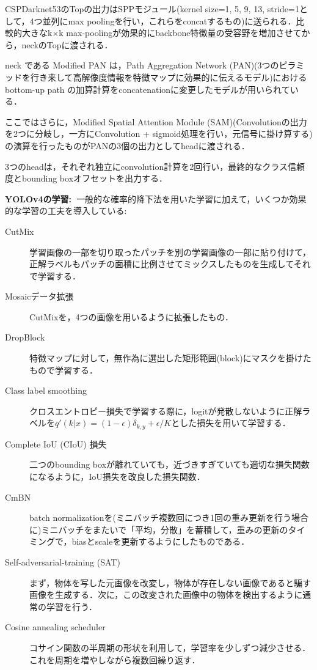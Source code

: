 \documentclass[originalpaper]{jsaiart}     %
\begin{document}
CSPDarknet53のTopの出力はSPPモジュール(kernel size={1, 5, 9, 13}, stride=1として，4つ並列にmax poolingを行い，これらをconcatするもの)に送られる．比較的大きなk$\times$k max-poolingが効果的にbackbone特徴量の受容野を増加させてから，neckのTopに渡される．

neck である Modified PAN は，Path Aggregation Network (PAN)(3つのピラミッドを行き来して高解像度情報を特徴マップに効果的に伝えるモデル)におけるbottom-up path の加算計算をconcatenationに変更したモデルが用いられている．

ここではさらに，Modified Spatial Attention Module (SAM)(Convolutionの出力を2つに分岐し，一方にConvolution + sigmoid処理を行い，元信号に掛け算する)の演算を行ったものがPANの3個の出力としてheadに渡される．

3つのheadは，それぞれ独立にconvolution計算を2回行い，最終的なクラス信頼度とbounding boxオフセットを出力する．

{\bf YOLOv4の学習:\ }一般的な確率的降下法を用いた学習に加えて，いくつか効果的な学習の工夫を導入している: 

\begin{description}
    \item[CutMix] 学習画像の一部を切り取ったパッチを別の学習画像の一部に貼り付けて，正解ラベルもパッチの面積に比例させてミックスしたものを生成してそれで学習する．
    \item[Mosaicデータ拡張] CutMixを，4つの画像を用いるように拡張したもの．
    \item[DropBlock] 特徴マップに対して，無作為に選出した矩形範囲(block)にマスクを掛けたもので学習する．
    \item[Class label smoothing] クロスエントロピー損失で学習する際に，logitが発散しないように正解ラベルを$q'(k|x)=(1-\epsilon)\delta_{k,y}+\epsilon/K$とした損失を用いて学習する．
    \item[Complete IoU (CIoU) 損失] 二つのbounding boxが離れていても，近づきすぎていても適切な損失関数になるように，IoU損失を改良した損失関数．
    \item[CmBN] batch normalizationを(ミニバッチ複数回につき1回の重み更新を行う場合に)ミニバッチをまたいで「平均，分散」を蓄積して，重みの更新のタイミングで，biasとscaleを更新するようにしたものである．
    \item[Self-adversarial-training (SAT)] まず，物体を写した元画像を改変し，物体が存在しない画像であると騙す画像を生成する．次に，この改変された画像中の物体を検出するように通常の学習を行う．
    \item[Cosine annealing scheduler] コサイン関数の半周期の形状を利用して，学習率を少しずつ減少させる．これを周期を増やしながら複数回繰り返す．
\end{description}
\end{document}
